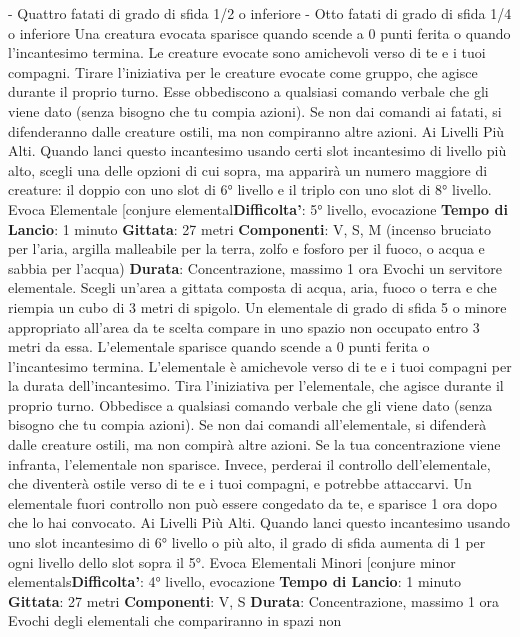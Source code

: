 \begin{multicols}{2}
- Quattro fatati di grado di sfida 1/2 o inferiore
- Otto fatati di grado di sfida 1/4 o inferiore
Una creatura evocata sparisce quando scende a 0 punti
ferita o quando l’incantesimo termina.
Le creature evocate sono amichevoli verso di te e i tuoi
compagni. Tirare l’iniziativa per le creature evocate
come gruppo, che agisce durante il proprio turno. Esse
obbediscono a qualsiasi comando verbale che gli viene
dato (senza bisogno che tu compia azioni). Se non dai
comandi ai fatati, si difenderanno dalle creature ostili,
ma non compiranno altre azioni.
Ai Livelli Più Alti. Quando lanci questo incantesimo
usando certi slot incantesimo di livello più alto, scegli
una delle opzioni di cui sopra, ma apparirà un numero
maggiore di creature: il doppio con uno slot di 6° livello
e il triplo con uno slot di 8° livello.
Evoca Elementale
[conjure elemental\textbf{Difficolta'}:
5° livello, evocazione
\textbf{Tempo di Lancio}: 1 minuto
\textbf{Gittata}: 27 metri
\textbf{Componenti}: V, S, M (incenso bruciato per l’aria,
argilla malleabile per la terra, zolfo e fosforo per il
fuoco, o acqua e sabbia per l’acqua)
\textbf{Durata}: Concentrazione, massimo 1 ora
Evochi un servitore elementale. Scegli un’area a gittata
composta di acqua, aria, fuoco o terra e che riempia un
cubo di 3 metri di spigolo. Un elementale di grado di
sfida 5 o minore appropriato all’area da te scelta
compare in uno spazio non occupato entro 3 metri da
essa. L’elementale sparisce quando scende a 0 punti
ferita o l’incantesimo termina.
L’elementale è amichevole verso di te e i tuoi compagni
per la durata dell’incantesimo. Tira l’iniziativa per
l’elementale, che agisce durante il proprio turno.
Obbedisce a qualsiasi comando verbale che gli viene
dato (senza bisogno che tu compia azioni). Se non dai
comandi all’elementale, si difenderà dalle creature ostili,
ma non compirà altre azioni.
Se la tua concentrazione viene infranta, l’elementale
non sparisce. Invece, perderai il controllo
dell’elementale, che diventerà ostile verso di te e i tuoi
compagni, e potrebbe attaccarvi. Un elementale fuori
controllo non può essere congedato da te, e sparisce 1
ora dopo che lo hai convocato.
Ai Livelli Più Alti. Quando lanci questo incantesimo
usando uno slot incantesimo di 6° livello o più alto, il
grado di sfida aumenta di 1 per ogni livello dello slot
sopra il 5°.
Evoca Elementali Minori
[conjure minor elementals\textbf{Difficolta'}:
4° livello, evocazione
\textbf{Tempo di Lancio}: 1 minuto
\textbf{Gittata}: 27 metri
\textbf{Componenti}: V, S
\textbf{Durata}: Concentrazione, massimo 1 ora
Evochi degli elementali che compariranno in spazi non

\end{multicols}
